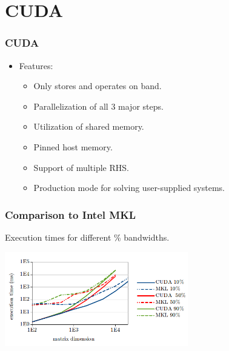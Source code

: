 \documentclass{beamer}
\begin{document}
\section{CUDA}
\begin{frame}
\frametitle{CUDA}
\begin{itemize}
\item{Features:
  \begin{itemize}
  \item{Only stores and operates on band.}
  \item{Parallelization of all 3 major steps.}
  \item{Utilization of shared memory.}
  \item{Pinned host memory.}
  \item{Support of multiple RHS.}
  \item{Production mode for solving user-supplied systems.}
  \end{itemize}
}
\end{itemize}
  \end{frame}
\begin{frame}
\frametitle{Comparison to Intel MKL}
Execution times for different \% bandwidths.
\centerline{\includegraphics[width=8cm]{full_scaling.png}}
\end{frame}
\end{document}
